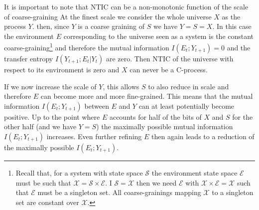 \documentclass[utf8]{article}
\newcommand{\X}{\mathcal{X}}
\renewcommand{\S}{\mathcal{S}}
\newcommand{\E}{\mathcal{E}}
\begin{document}
    		It is important to note that NTIC can be a non-monotonic function of the scale of coarse-graining
    		At the finest scale we consider the whole universe $X$ as the process $Y$. then, since $Y$ is a coarse graining of $S$ we have $Y=S=X$.  
    		In this case the environment $E$ corresponding to the universe seen as a system is the constant coarse-graining\footnote{Recall that, for a system with state space $\S$ the environment state space $\E$ must be such that $\X=\S \times \E$. I $\S =\X$ then we need $\E$ with $\X \times \E=\X$ such that $\E$ must be a singleton set. All coarse-grainings mapping $\X$ to a singleton set are constant over $\X$.} and therefore the mutual information $I(E_t;Y_{t+1})=0$ and the transfer entropy $I(Y_{t+1};E_t|Y_t)$ are zero. Then NTIC of the universe with respect to its environment is zero and $X$ can never be a C-process.
    		
    		If we now increase the scale of $Y$, this allows $S$ to also reduce in scale and therefore $E$ can become more and more fine-grained. This means that the mutual information $I(E_t;Y_{t+1})$ between $E$ and $Y$ can at least potentially become positive. Up to the point where $E$ accounts for half of the bits of $X$ and $S$ for the other half (and we have $Y=S$) the maximally possible mutual information $I(E_t;Y_{t+1})$ increases. Even further refining $E$ then again leads to a reduction of the maximally possible $I(E_t;Y_{t+1})$.  
    		
\end{document}
